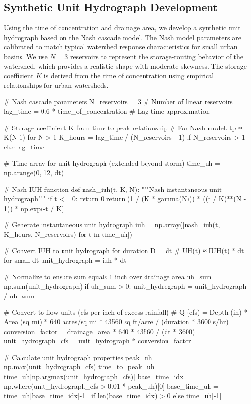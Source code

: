 \documentclass[a4paper, 11pt]{article}
\begin{document}
\subsection{Synthetic Unit Hydrograph Development}

Using the time of concentration and drainage area, we develop a synthetic unit hydrograph
based on the Nash cascade model. The Nash model parameters are calibrated to match typical
watershed response characteristics for small urban basins. We use $N = 3$ reservoirs to
represent the storage-routing behavior of the watershed, which provides a realistic shape
with moderate skewness. The storage coefficient $K$ is derived from the time of concentration
using empirical relationships for urban watersheds.

\begin{pycode}
# Nash cascade parameters
N_reservoirs = 3  # Number of linear reservoirs
lag_time = 0.6 * time_of_concentration  # Lag time approximation

# Storage coefficient K from time to peak relationship
# For Nash model: tp ≈ K(N-1) for N > 1
K_hours = lag_time / (N_reservoirs - 1) if N_reservoirs > 1 else lag_time

# Time array for unit hydrograph (extended beyond storm)
time_uh = np.arange(0, 12, dt)

# Nash IUH function
def nash_iuh(t, K, N):
    """Nash instantaneous unit hydrograph"""
    if t <= 0:
        return 0
    return (1 / (K * gamma(N))) * ((t / K)**(N - 1)) * np.exp(-t / K)

# Generate instantaneous unit hydrograph
iuh = np.array([nash_iuh(t, K_hours, N_reservoirs) for t in time_uh])

# Convert IUH to unit hydrograph for duration D = dt
# UH(t) ≈ IUH(t) * dt for small dt
unit_hydrograph = iuh * dt

# Normalize to ensure sum equals 1 inch over drainage area
uh_sum = np.sum(unit_hydrograph)
if uh_sum > 0:
    unit_hydrograph = unit_hydrograph / uh_sum

# Convert to flow units (cfs per inch of excess rainfall)
# Q (cfs) = Depth (in) * Area (sq mi) * 640 acres/sq mi * 43560 sq ft/acre / (duration * 3600 s/hr)
conversion_factor = drainage_area * 640 * 43560 / (dt * 3600)
unit_hydrograph_cfs = unit_hydrograph * conversion_factor

# Calculate unit hydrograph properties
peak_uh = np.max(unit_hydrograph_cfs)
time_to_peak_uh = time_uh[np.argmax(unit_hydrograph_cfs)]
base_time_idx = np.where(unit_hydrograph_cfs > 0.01 * peak_uh)[0]
base_time_uh = time_uh[base_time_idx[-1]] if len(base_time_idx) > 0 else time_uh[-1]


\end{pycode}
\end{document}
